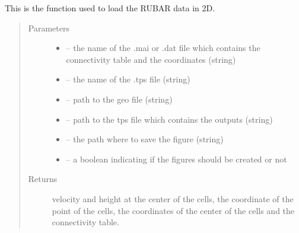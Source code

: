 \documentclass[letterpaper,10pt,english]{sphinxmanual}
\begin{document}
\begin{fulllineitems}
\label{\detokenize{index:src.rubar.load_rubar2d}}
This is the function used to load the RUBAR data in 2D.
\begin{quote}\begin{description}
\item[{Parameters}] \leavevmode\begin{itemize}
\item {} 
 -- the name of the .mai or .dat file which contains the connectivity table and the coordinates (string)

\item {} 
 -- the name of the .tps file (string)

\item {} 
 -- path to the geo file (string)

\item {} 
 -- path to the tps file which contains the outputs (string)

\item {} 
 -- the path where to save the figure (string)

\item {} 
 -- a boolean indicating if the figures should be created or not

\end{itemize}

\item[{Returns}] \leavevmode
velocity and height at the center of the cells, the coordinate of the point of the cells,
the coordinates of the center of the cells and the connectivity table.

\end{description}\end{quote}

\end{fulllineitems}

\end{document}
